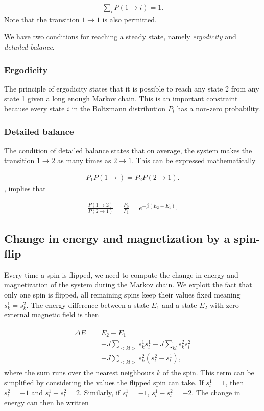 \documentclass[../main.tex]{subfiles}
\begin{document}
\begin{align}
    \sum_iP(1\rightarrow i)=1. 
\end{align} Note that the transition $1\rightarrow1$ is also permitted. 

We have two conditions for reaching a steady state, namely \textit{ergodicity} and \textit{detailed balance}. 

\subsubsection{Ergodicity}
The principle of ergodicity states that it is possible to reach any state 2 from any state 1 given a long enough Markov chain. This is an important constraint because every state $i$ in the Boltzmann distribution $P_i$ has a non-zero probability. 

\subsubsection{Detailed balance}
The condition of detailed balance states that on average, the system makes the transition \ensuremath{1\rightarrow2} as many times as \ensuremath{2\rightarrow1}. This can be expressed mathematically 

\begin{align}
    P_1P(1\rightarrow)=P_2P(2\rightarrow1).
    \label{eq:detailed-balance}
\end{align} , implies that

\begin{align}
    \frac{P(1\rightarrow2)}{P(2\rightarrow1)}=\frac{P_2}{P_1}=e^{-\beta(E_2-E_1)}.
\end{align}

\subsection{Change in energy and magnetization by a spin-flip}\label{sec:energy-magnetization-change}
Every time a spin is flipped, we need to compute the change in energy and magnetization of the system during the Markov chain. We exploit the fact that only one spin is flipped, all remaining spins keep their values fixed meaning \ensuremath{s_k^1=s_k^2}. The energy difference between a state $E_1$ and a state $E_2$ with zero external magnetic field is then

\begin{align}
    \begin{split}
        \Delta E &= E_2-E_1 \\
        &=-J\sum_{<kl>}s_k^1s_l^1-J\sum_{kl}s_k^2s_l^2 \\
        &= -J\sum_{<kl>}s_k^2(s_l^2-s_l^1), 
    \end{split}
\end{align} where the sum runs over the nearest neighbours $k$ of the spin. This term can be simplified by considering the values the flipped spin can take. If $s_l^1=1$, then $s_l^2=-1$ and $s_l^1-s_l^2=2$. Similarly, if $s_l^1=-1$, $s_l^1-s_l^2=-2$. The change in energy can then be written
\end{document}
